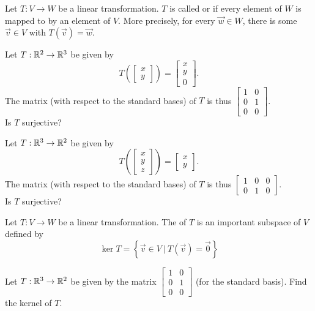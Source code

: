 \begin{applicationActivities}{2}{18}
\begin{definition}
Let $T: V \rightarrow W$ be a linear transformation.
$T$ is called  or  if every element of $W$ is mapped to by an element of $V$.  More precisely, for every $\vec{w} \in W$, there is some $\vec{v} \in V$ with $T(\vec{v})=\vec{w}$.
\end{definition}

\begin{activity}{5}
Let $T: \mathbb{R}^2 \rightarrow \mathbb{R}^3$ be given by $$T\left(\begin{bmatrix}x \\ y \end{bmatrix} \right) = \begin{bmatrix} x \\ y \\ 0 \end{bmatrix}.$$
The matrix (with respect to the standard bases) of $T$ is thus $\begin{bmatrix} 1 & 0 \\ 0 & 1 \\ 0 & 0 \end{bmatrix}$. \\
Is $T$ surjective?
\end{activity}

\begin{activity}{5}
Let $T: \mathbb{R}^3 \rightarrow \mathbb{R}^2$ be given by $$T\left(\begin{bmatrix} x \\ y \\ z \end{bmatrix} \right) = \begin{bmatrix} x \\ y \end{bmatrix}.$$  The matrix (with respect to the standard bases) of $T$ is thus $\begin{bmatrix} 1 & 0 &0  \\ 0 & 1 & 0 \end{bmatrix}$.\\
Is $T$ surjective?
\end{activity}


\begin{definition}
Let $T: V \rightarrow W$ be a linear transformation.  The  of $T$
is an important subspace of \(V\) defined by
\[
\ker T = \left\{ \vec{v} \in V\ \big|\ T(\vec{v})=\vec{0}\right\}
\]
\end{definition}

\begin{activity}{5}
Let $T: \mathbb{R}^3 \rightarrow \mathbb{R}^2$ be given by the matrix $\begin{bmatrix} 1 & 0 \\ 0 & 1 \\ 0 & 0 \end{bmatrix}$ (for the standard basis).  Find the kernel of $T$.
\end{activity}


\end{applicationActivities}
